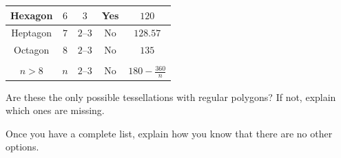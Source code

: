 \documentclass[noauthor,nooutcomes,handout,12pt]{ximera}
\begin{document}
\begin{question}
\begin{freeResponse}
\begin{center}
\begin{tabular}{|c||c|c|c|c|}
Hexagon & $6$ & $3$ & Yes & $120$\\ \hline
Heptagon & $7$ & $2$--$3$ &  No& $128.57$\\ \hline
Octagon & $8$ & $2$--$3$ & No & $135$\\ \hline\hline
\begin{minipage}{1in}
  \begin{center}
    $n$-gon\\ $n> 8$
  \end{center}
  \end{minipage} & $n$ & $2$--$3$ & No  & $180-\frac{360}{n}$\\ \hline
\end{tabular}
\end{center}
\end{freeResponse}
\end{question}
\mynewpage

\begin{question}
 Are these the only possible tessellations with regular polygons? If not, explain which ones are missing.
 
 Once you have a complete list, explain how you know that there are no other options.
\end{question}
\end{document}
